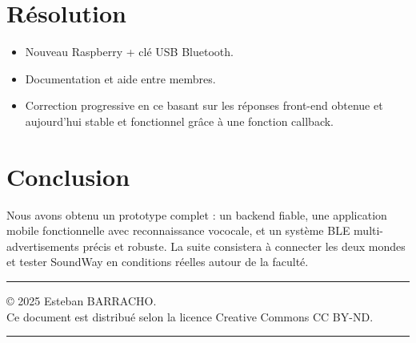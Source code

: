 \documentclass[12pt,a4paper]{article}
\begin{document}
\section{Résolution}

\begin{itemize}
    \item Nouveau Raspberry + clé USB Bluetooth.
    \item Documentation et aide entre membres.
    \item Correction progressive en ce basant sur les réponses front-end obtenue et aujourd’hui stable et fonctionnel grâce à une fonction callback.
\end{itemize}

\section{Conclusion}

Nous avons obtenu un prototype complet : un backend fiable, une application mobile fonctionnelle avec reconnaissance vococale, et un système BLE multi-advertisements précis et robuste. La suite consistera à connecter les deux mondes et tester SoundWay en conditions réelles autour de la faculté.

\bigskip
\hrule
\bigskip

{\small \noindent © 2025 Esteban BARRACHO.\\
Ce document est distribué selon la licence Creative Commons CC BY-ND.
\doclicenseThis}

\bigskip
\hrule
\end{document}
